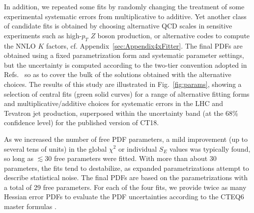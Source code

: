 In addition, we repeated some fits by randomly changing the treatment of some experimental systematic errors from multiplicative to additive. Yet another class of candidate fits is obtained by choosing alternative QCD scales in sensitive experiments such as high-$p_T$ $Z$ boson production, or alternative codes to compute the NNLO $K$ factors, cf. Appendix~\ref{sec:Appendix4xFitter}. 
The final PDFs are obtained using a fixed parametrization form and systematic parameter settings, but the uncertainty is computed according to the two-tier convention adopted in Refs.~\cite{Lai:2010vv,Gao:2013xoa} so as to cover the bulk of the solutions obtained with the alternative choices.  The results of this study are illustrated in Fig.~\ref{fig:params}, showing a selection of central fits (green solid curves) for a range of alternative fitting forms and multiplicative/additive choices for systematic errors in the LHC and Tevatron jet production, superposed within
the uncertainty band (at the 68\% confidence level) for the published version of CT18. 

As we increased the number of free PDF parameters, a mild improvement (up to several tens of units) in the global $\chi^2$ or individual $S_E$ values was typically found, so long as $\lesssim\! 30$ free parameters were fitted. With more than about 30 parameters, the fits tend to destabilize, as expanded parametrizations attempt to describe statistical noise. The final PDFs are based on the parametrizations with a total of 29 free parameters. For each of the four fits, we provide twice as many Hessian error PDFs to evaluate the PDF uncertainties according to the CTEQ6 master formulas \cite{Pumplin:2002vw}.

